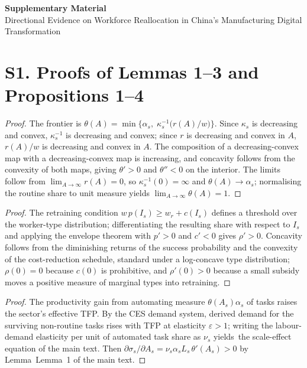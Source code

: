 \documentclass[12pt]{article}
\begin{document}
\begin{center}
{\Large\bfseries Supplementary Material}\\
\vspace{4pt}
{\large Directional Evidence on Workforce Reallocation in China's Manufacturing Digital Transformation}
\end{center}

\section*{S1. Proofs of Lemmas 1--3 and Propositions 1--4}
\begin{proof}
The frontier is $\theta(A)=\min\bigl\{\alpha_s,\;\kappa_s^{-1}\bigl(r(A)/w\bigr)\bigr\}$. Since $\kappa_s$ is decreasing and convex, $\kappa_s^{-1}$ is decreasing and convex; since $r$ is decreasing and convex in $A$, $r(A)/w$ is decreasing and convex in $A$. The composition of a decreasing-convex map with a decreasing-convex map is increasing, and concavity follows from the convexity of both maps, giving $\theta'>0$ and $\theta''<0$ on the interior. The limits follow from $\lim_{A\to\infty}r(A)=0$, so $\kappa_s^{-1}(0)=\infty$ and $\theta(A)\to\alpha_s$; normalising the routine share to unit measure yields $\lim_{A\to\infty}\theta(A)=1$.
\end{proof}
\begin{proof}
The retraining condition $w\,p(I_s)\ge w_r+c(I_s)$ defines a threshold over the worker-type distribution; differentiating the resulting share with respect to $I_s$ and applying the envelope theorem with $p'>0$ and $c'<0$ gives $\rho'>0$. Concavity follows from the diminishing returns of the success probability and the convexity of the cost-reduction schedule, standard under a log-concave type distribution; $\rho(0)=0$ because $c(0)$ is prohibitive, and $\rho'(0)>0$ because a small subsidy moves a positive measure of marginal types into retraining.
\end{proof}
\begin{proof}
The productivity gain from automating measure $\theta(A_s)\alpha_s$ of tasks raises the sector's effective TFP. By the CES demand system, derived demand for the surviving non-routine tasks rises with TFP at elasticity $\varepsilon>1$; writing the labour-demand elasticity per unit of automated task share as $\nu_s$ yields~the scale-effect equation of the main text. Then $\partial\sigma_s/\partial A_s=\nu_s\alpha_s L_s\,\theta'(A_s)>0$ by Lemma~Lemma~1 of the main text.
\end{proof}
\end{document}
